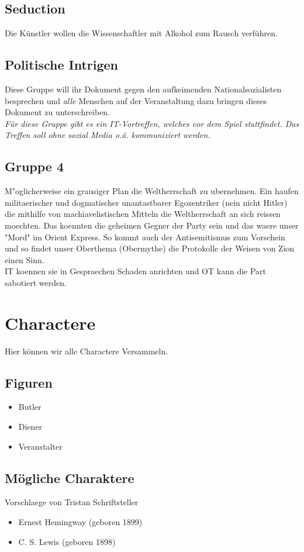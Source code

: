 \documentclass[12pt, a4paper, openany]{report}
\begin{document}
\section{Seduction}
Die Künstler wollen die Wissenschaftler mit Alkohol zum Rausch verführen.

\section{Politische Intrigen}
Diese Gruppe will ihr Dokument gegen den aufkeimenden Nationalsozialisten besprechen und \emph{alle} Menschen auf der Veranstaltung dazu bringen dieses Dokument zu unterschreiben.\\

\emph{Für diese Gruppe gibt es ein IT-Vortreffen, welches vor dem Spiel stattfindet.
Das Treffen soll ohne sozial Media o.ä. kommuniziert werden.}

\section{Gruppe 4}

M"oglicherweise ein grausiger Plan die Weltherrschaft zu ubernehmen. 
Ein haufen militaerischer und dogmatischer unantastbarer Egozentriker (nein nicht Hitler) die mithilfe von machiavelistischen Mitteln die Weltherrschaft an sich reissen moechten. Das koennten die geheimen Gegner der Party sein und das waere unser "Mord" im Orient Express. So kommt auch der Antisemitismus zum Vorschein und so findet unser Oberthema (Obermythe) die Protokolle der Weisen von Zion einen Sinn.\\
IT koennen sie in Gespraechen Schaden anrichten und OT kann die Part sabotiert werden.

\chapter{Charactere}
Hier können wir alle Charactere Versammeln.

\section{Figuren}
\begin{itemize}
    \item Butler
    \item Diener
    \item Veranstalter
\end{itemize}

\section{Mögliche Charaktere}
Vorschlaege von Tristan
Schriftsteller
\begin{itemize}
    \item Ernest Hemingway (geboren 1899)
    \item C. S. Lewis (geboren 1898)
\end{itemize}
\end{document}
